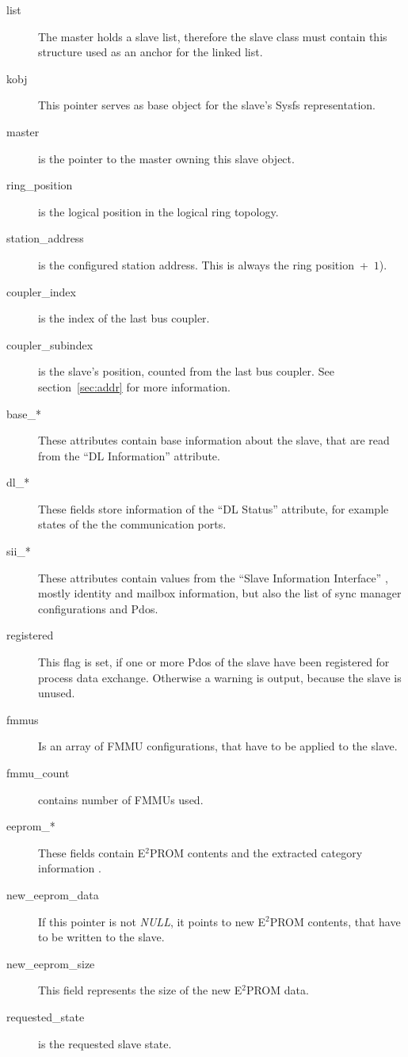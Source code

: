 \documentclass[a4paper,12pt,BCOR6mm,bibtotoc,idxtotoc]{scrbook}
\begin{document}
\begin{description}
\item[list] The master holds a slave list, therefore the slave class
  must contain this structure used as an anchor for the linked
  list.
\item[kobj] This pointer serves as base object for the slave's Sysfs
  representation.
\item[master] is the pointer to the master owning this slave object.
\item[ring\_position] is the logical position in the logical ring
  topology.
\item[station\_address] is the configured station address. This is
  always the ring position~+~$1$).
\item[coupler\_index] is the index of the last bus coupler.
\item[coupler\_subindex] is the slave's position, counted from the
  last bus coupler. See section~\ref{sec:addr} for more information.
\item[base\_*] These attributes contain base information about the
  slave, that are read from the ``DL Information'' attribute.
\item[dl\_*] These fields store information of the ``DL Status''
  attribute, for example states of the the communication ports.
\item[sii\_*] These attributes contain values from the ``Slave
  Information Interface'' \cite[section~6.4]{dlspec}, mostly identity
  and mailbox information, but also the list of sync manager
  configurations and Pdos.
\item[registered] This flag is set, if one or more Pdos of the slave
  have been registered for process data exchange. Otherwise a warning
  is output, because the slave is unused.
\item[fmmus] Is an array of FMMU configurations, that have to be
  applied to the slave.
\item[fmmu\_count] contains number of FMMUs used.
\item[eeprom\_*] These fields contain E$^2$PROM contents and the
  extracted category information \cite[section~5.4]{alspec}.
\item[new\_eeprom\_data] If this pointer is not \textit{NULL}, it
  points to new E$^2$PROM contents, that have to be written to the
  slave.
\item[new\_eeprom\_size] This field represents the size of the new
  E$^2$PROM data.
\item[requested\_state] is the requested slave state.

\end{description}
\end{document}
